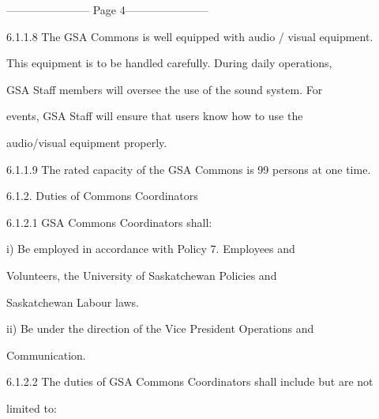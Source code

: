   


----------------------- Page 4-----------------------

6.1.1.8   The GSA Commons is well equipped with audio / visual equipment.  

             This equipment is to be handled carefully. During daily operations,  

             GSA Staff members will oversee the use of the sound system. For  

             events,  GSA  Staff  will  ensure  that  users  know  how  to  use  the  

             audio/visual equipment properly.   



6.1.1.9   The rated capacity of the GSA Commons is 99 persons at one time.   



  



                          6.1.2. Duties of Commons Coordinators  



  



6.1.2.1   GSA Commons Coordinators shall:   



  



         i)        Be  employed  in  accordance  with  Policy  7.  Employees  and  

                   Volunteers,   the          University        of    Saskatchewan           Policies       and  

                   Saskatchewan Labour laws.   



  



         ii)       Be  under  the  direction  of  the  Vice  President  Operations  and  

                   Communication.   



  



6.1.2.2   The duties of GSA Commons Coordinators shall include but are not  

             limited to:   



  



